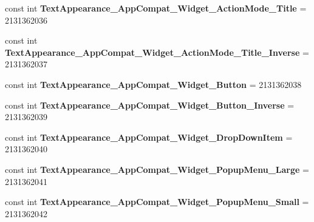 \begin{DoxyCompactItemize}
\mbox{\label{class_sample_app_1_1_droid_1_1_resource_1_1_style_a58b55639537b7a0203d91ca705af7e54}} 
const int {\bfseries Text\+Appearance\+\_\+\+App\+Compat\+\_\+\+Widget\+\_\+\+Action\+Mode\+\_\+\+Title} = 2131362036
\item 
\mbox{\label{class_sample_app_1_1_droid_1_1_resource_1_1_style_a8bc4164c0c4da174770676b77ec0b7bb}} 
const int {\bfseries Text\+Appearance\+\_\+\+App\+Compat\+\_\+\+Widget\+\_\+\+Action\+Mode\+\_\+\+Title\+\_\+\+Inverse} = 2131362037
\item 
\mbox{\label{class_sample_app_1_1_droid_1_1_resource_1_1_style_a768f892925c2314149d16975db646180}} 
const int {\bfseries Text\+Appearance\+\_\+\+App\+Compat\+\_\+\+Widget\+\_\+\+Button} = 2131362038
\item 
\mbox{\label{class_sample_app_1_1_droid_1_1_resource_1_1_style_aaed141e1dee24bd72f6a5dafa1c48044}} 
const int {\bfseries Text\+Appearance\+\_\+\+App\+Compat\+\_\+\+Widget\+\_\+\+Button\+\_\+\+Inverse} = 2131362039
\item 
\mbox{\label{class_sample_app_1_1_droid_1_1_resource_1_1_style_ab094c343a9a31b233eb494d8c5805a38}} 
const int {\bfseries Text\+Appearance\+\_\+\+App\+Compat\+\_\+\+Widget\+\_\+\+Drop\+Down\+Item} = 2131362040
\item 
\mbox{\label{class_sample_app_1_1_droid_1_1_resource_1_1_style_afb2851b478cd7efd27c8879c383f7df5}} 
const int {\bfseries Text\+Appearance\+\_\+\+App\+Compat\+\_\+\+Widget\+\_\+\+Popup\+Menu\+\_\+\+Large} = 2131362041
\item 
\mbox{\label{class_sample_app_1_1_droid_1_1_resource_1_1_style_a6b901cfb18cc4ce56de639a133dba8d0}} 
const int {\bfseries Text\+Appearance\+\_\+\+App\+Compat\+\_\+\+Widget\+\_\+\+Popup\+Menu\+\_\+\+Small} = 2131362042
\item 
\mbox{\label{class_sample_app_1_1_droid_1_1_resource_1_1_style_a66defa90dd5dd9c0b61394a7e147f0ff}} 

\end{DoxyCompactItemize}
